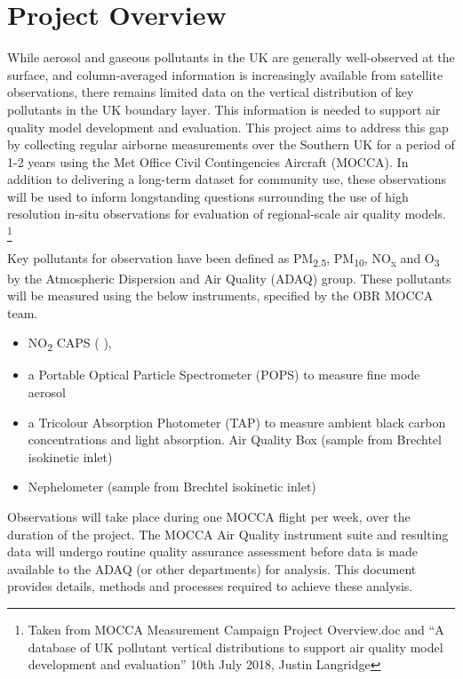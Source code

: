 \documentclass[11pt]{article} %
\begin{document}
\section{Project Overview}

While aerosol and gaseous pollutants in the UK are generally well-observed at the surface, and column-averaged information is increasingly available from satellite observations, there remains limited data on the vertical distribution of key pollutants in the UK boundary layer. This information is needed to support air quality model development and evaluation. This project aims to address this gap by collecting regular airborne measurements over the Southern UK for a period of 1-2 years using the Met Office Civil Contingencies Aircraft (MOCCA). In addition to delivering a long-term dataset for community use, these observations will be used to inform longstanding questions surrounding the use of high resolution in-situ observations for evaluation of regional-scale air quality models. \footnote{Taken from MOCCA Measurement Campaign Project Overview.doc and  “A database of UK pollutant vertical distributions to support air quality model development and evaluation” 10th July 2018, Justin Langridge}

Key pollutants for observation have been defined as PM\textsubscript{2.5}, PM\textsubscript{10}, NO\textsubscript{x} and O\textsubscript{3} by the Atmospheric Dispersion and Air Quality (ADAQ) group. These pollutants will be measured using the below instruments, specified by the OBR MOCCA team.

\begin{itemize}
\item  NO\textsubscript{2} CAPS ( ), 
\item a Portable Optical Particle Spectrometer (POPS) to measure fine mode aerosol 
\item a Tricolour Absorption Photometer (TAP) to measure ambient black carbon concentrations and light absorption.  Air Quality Box (sample from Brechtel isokinetic inlet)
\item Nephelometer (sample from Brechtel isokinetic inlet)
\end{itemize}

Observations will take place during one MOCCA flight per week, over the duration of the project. The MOCCA Air Quality instrument suite and resulting data will undergo routine quality assurance assessment before data is made available to the ADAQ (or other departments) for analysis. This document provides details, methods and processes required to achieve these analysis.  
\end{document}
